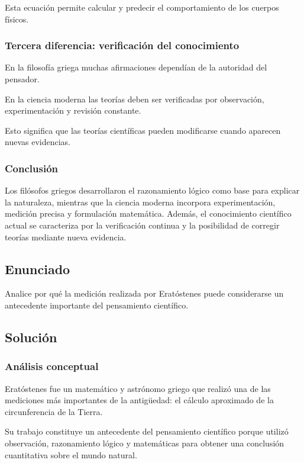 \documentclass[12pt, a4paper]{article}
\begin{document}
Esta ecuación permite calcular y predecir el comportamiento de los cuerpos físicos.

\subsubsection*{Tercera diferencia: verificación del conocimiento}

En la filosofía griega muchas afirmaciones dependían de la autoridad del pensador.

En la ciencia moderna las teorías deben ser verificadas por observación, experimentación y revisión constante.

Esto significa que las teorías científicas pueden modificarse cuando aparecen nuevas evidencias.

\subsubsection*{Conclusión}

Los filósofos griegos desarrollaron el razonamiento lógico como base para explicar la naturaleza, mientras que la ciencia moderna incorpora experimentación, medición precisa y formulación matemática. Además, el conocimiento científico actual se caracteriza por la verificación continua y la posibilidad de corregir teorías mediante nueva evidencia.

\newpage

\subsection*{Enunciado}

Analice por qué la medición realizada por Eratóstenes puede considerarse un antecedente importante del pensamiento científico.

\subsection*{Solución}

\subsubsection*{Análisis conceptual}

Eratóstenes fue un matemático y astrónomo griego que realizó una de las mediciones más importantes de la antigüedad: el cálculo aproximado de la circunferencia de la Tierra.

Su trabajo constituye un antecedente del pensamiento científico porque utilizó observación, razonamiento lógico y matemáticas para obtener una conclusión cuantitativa sobre el mundo natural.
\end{document}
